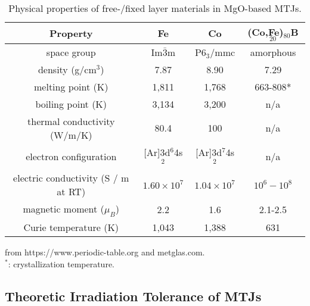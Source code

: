 \documentclass[molecules,review,submit,pdftex,moreauthors]{Definitions/mdpi}
\begin{document}
\begin{table} %
\caption{Physical properties of free-/fixed layer materials in MgO-based MTJs.}
\label{Tab:MagneticMaterialProperty}
\centering
\begin{tabular}{cccc} %
\toprule
    Property & Fe & Co & (Co,Fe)$_{80}$B$_{20}$ \\
\midrule
   space group & Im$\bar{3}$m & P6$_3$/mmc & amorphous \cite{Gayen2017JAC}\\
   density (g/cm$^3$) & 7.87 & 8.90 & 7.29 \\
   melting point (K) & 1,811 & 1,768 & 663-808* \cite{Koster1978SM} \\
   boiling point (K) & 3,134 & 3,200 & n/a \\
   thermal conductivity (W/m/K) & 80.4  & 100 & n/a \\
   electron configuration & [Ar]3d$^6$4s$^2$ & [Ar]3d$^7$4s$^2$ & n/a \\
   electric conductivity (S / m at RT) & $1.60 \times 10^7$ & $1.04 \times 10^7$ & $10^6 - 10^8$ \cite{Roy1981JMMM} \\
   magnetic moment ($\mu_B$) & 2.2 & 1.6 & 2.1-2.5 \cite{Srivastava2018PRA} \\
   Curie temperature (K) & 1,043 & 1,388 & 631 \\
\bottomrule
\end{tabular}

from https://www.periodic-table.org and metglas.com. \\
$^*$: crystallization temperature.

\end{table}    





\vspace{12pt}
\subsection{Theoretic Irradiation Tolerance of MTJs}
\end{document}

